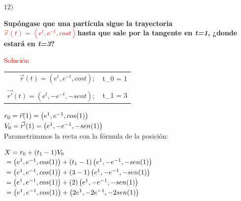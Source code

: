 \documentclass[12pt, letter-paper]{article}
\begin{document}
\begin{enumerate}
    \item [$12)$]
    \normalsize{\textbf{Supóngase que una partícula sigue la trayectoria \textcolor{Red}{$\vec{r}(t)=\left \langle e^{t},e^{-t},cost \right \rangle$\:}hasta que sale por la tangente en \textit{t=1}, ¿donde estará en \textit{t=3}?}\par}
    \vspace{0.5cm}
    \large{\textcolor{red}{Solución}\par}
    \vspace{0.5cm}
                    \begin{tabular}{r l}
                    $\vec{r}(t)=\left (e^{t},e^{-t},cost \right);$ &  \:\:t_{0} = 1  \\
                    \\$\vec{r'}(t)=\left (e^{t},-e^{-t},-sent \right);$ &   \:\: t_{1} = 3
                    \end{tabular}\par
    \vspace{1cm}
    $\\r_{0}=\vec{r}(1)=\left (e^{1},e^{-1},cos(1) \right)$\\    
    $\\V_{0}=\vec{r'}(1)=\left (e^{1},-e^{-1},-sen(1) \right)$
    \vspace{1cm}
    \\\normalsize{Parametrizamos la recta con la fórmula de la posición:}\par
    \begin{center}
        \large{\fboxrule=0.5pt }   
    \end{center}
    \par
    $\\X=r_{0}+(t_{1}-1)V_{0}$\\
    $\\=\left (e^{1},e^{-1},cos(1)\right)+(t_{1}-1)\left (e^{1},-e^{-1},-sen(1)\right)$\\    
    $\\=\left (e^{1},e^{-1},cos(1)\right)+(3-1)\left (e^{1},-e^{-1},-sen(1)\right)$\\    
    $\\=\left (e^{1},e^{-1},cos(1)\right)+(2)\left (e^{1},-e^{-1},-sen(1)\right)$\\    
    $\\=\left (e^{1},e^{-1},cos(1)\right)+\left (2e^{1},-2e^{-1},-2sen(1)\right)$\\    
    \par
    \normalsize{\fboxrule=0.5pt }
    

\end{enumerate}
\end{document}
